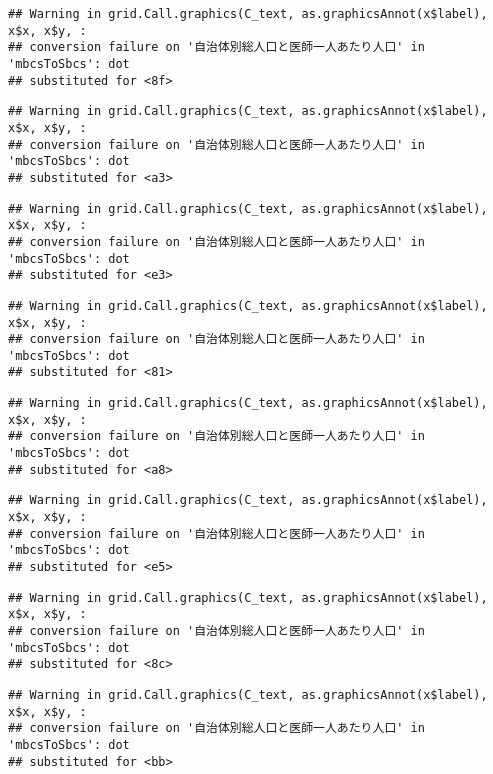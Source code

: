 \documentclass[
]{article}
\begin{document}
\begin{verbatim}
## Warning in grid.Call.graphics(C_text, as.graphicsAnnot(x$label), x$x, x$y, :
## conversion failure on '自治体別総人口と医師一人あたり人口' in 'mbcsToSbcs': dot
## substituted for <8f>
\end{verbatim}

\begin{verbatim}
## Warning in grid.Call.graphics(C_text, as.graphicsAnnot(x$label), x$x, x$y, :
## conversion failure on '自治体別総人口と医師一人あたり人口' in 'mbcsToSbcs': dot
## substituted for <a3>
\end{verbatim}

\begin{verbatim}
## Warning in grid.Call.graphics(C_text, as.graphicsAnnot(x$label), x$x, x$y, :
## conversion failure on '自治体別総人口と医師一人あたり人口' in 'mbcsToSbcs': dot
## substituted for <e3>
\end{verbatim}

\begin{verbatim}
## Warning in grid.Call.graphics(C_text, as.graphicsAnnot(x$label), x$x, x$y, :
## conversion failure on '自治体別総人口と医師一人あたり人口' in 'mbcsToSbcs': dot
## substituted for <81>
\end{verbatim}

\begin{verbatim}
## Warning in grid.Call.graphics(C_text, as.graphicsAnnot(x$label), x$x, x$y, :
## conversion failure on '自治体別総人口と医師一人あたり人口' in 'mbcsToSbcs': dot
## substituted for <a8>
\end{verbatim}

\begin{verbatim}
## Warning in grid.Call.graphics(C_text, as.graphicsAnnot(x$label), x$x, x$y, :
## conversion failure on '自治体別総人口と医師一人あたり人口' in 'mbcsToSbcs': dot
## substituted for <e5>
\end{verbatim}

\begin{verbatim}
## Warning in grid.Call.graphics(C_text, as.graphicsAnnot(x$label), x$x, x$y, :
## conversion failure on '自治体別総人口と医師一人あたり人口' in 'mbcsToSbcs': dot
## substituted for <8c>
\end{verbatim}

\begin{verbatim}
## Warning in grid.Call.graphics(C_text, as.graphicsAnnot(x$label), x$x, x$y, :
## conversion failure on '自治体別総人口と医師一人あたり人口' in 'mbcsToSbcs': dot
## substituted for <bb>
\end{verbatim}
\end{document}

